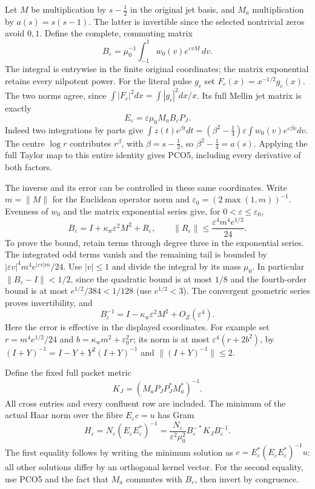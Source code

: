 Let $M$ be multiplication by $s-\frac12$ in the original jet
basis, and $M_a$ multiplication by $a(s)=s(s-1)$. The latter
is invertible since the selected nontrivial zeros avoid $0,1$.
Define the complete, commuting matrix
\[
 B_\varepsilon=\mu_0^{-1}\int_{-1}^1
                 w_0(v)e^{\varepsilon vM}\,dv.
 \tag{PCO4}\label{pco:unit}
\]
The integral is entrywise in the finite original coordinates;
the matrix exponential retains every nilpotent power. For the
literal pulse $g_c$ set $F_c(x)=x^{-1/2}g_c(x)$. The two norms
agree, since $\int|F_c|^2dx=\int|g_c|^2dx/x$. Its full Mellin
jet matrix is exactly
\[
 E_\varepsilon=\varepsilon\mu_0 M_a B_\varepsilon P_J.
 \tag{PCO5}\label{pco:observation}
\]
Indeed two integrations by parts give
$\int z(t)e^{\beta t}dt=(\beta^2-\frac14)
\varepsilon\int w_0(v)e^{\varepsilon\beta v}dv$.
The centre $\log r$ contributes $r^\beta$, with
$\beta=s-\frac12$, so $\beta^2-\frac14=a(s)$.
Applying the full Taylor map to this entire identity gives
PCO5, including every derivative of both factors.

The inverse and its error can be controlled in these same
coordinates. Write $m=\|M\|$ for the Euclidean operator norm
and $\varepsilon_0=(2\max(1,m))^{-1}$. Evenness of $w_0$ and
the matrix exponential series give, for $0<\varepsilon\le
\varepsilon_0$,
\[
 B_\varepsilon=I+\kappa_w\varepsilon^2M^2+R_\varepsilon,
 \qquad
 \|R_\varepsilon\|\le
       \frac{\varepsilon^4m^4e^{1/2}}{24}.
 \tag{PCO6}\label{pco:remainder}
\]
To prove the bound, retain terms through degree three in the
exponential series. The integrated odd terms vanish and the
remaining tail is bounded by
$|\varepsilon v|^4m^4e^{|\varepsilon v|m}/24$.
Use $|v|\le1$ and divide the integral by its mass $\mu_0$.
In particular $\|B_\varepsilon-I\|<1/2$, since the quadratic
bound is at most $1/8$ and the fourth-order bound is at most
$e^{1/2}/384<1/128$ (use $e^{1/2}<3$).
The convergent geometric series proves invertibility, and
\[
 B_\varepsilon^{-1}=I-\kappa_w\varepsilon^2M^2
                              +O_{Z}(\varepsilon^4).
 \tag{PCO7}\label{pco:inverse}
\]
Here the error is effective in the displayed coordinates. For
example set $r=m^4e^{1/2}/24$ and
$b=\kappa_wm^2+\varepsilon_0^2r$; its norm is at most
$\varepsilon^4(r+2b^2)$, by
$(I+Y)^{-1}=I-Y+Y^2(I+Y)^{-1}$ and
$\|(I+Y)^{-1}\|\le2$.

Define the fixed full packet metric
\[
 K_J=(M_aP_JP_J^*M_a^*)^{-1}.
 \tag{PCO8}\label{pco:fixed-metric}
\]
All cross entries and every confluent row are included. The
minimum of the actual Haar norm over the fibre
$E_\varepsilon c=u$ has Gram
\[
 H_\varepsilon
  =N_\varepsilon(E_\varepsilon E_\varepsilon^*)^{-1}
  =\frac{N_\varepsilon}{\varepsilon^2\mu_0^2}
                B_\varepsilon^{-*}K_JB_\varepsilon^{-1}.
 \tag{PCO9}\label{pco:attained}
\]
The first equality follows by writing the minimum solution as
$c=E_\varepsilon^*(E_\varepsilon E_\varepsilon^*)^{-1}u$:
all other solutions differ by an orthogonal kernel vector.
For the second equality, use PCO5 and the fact that $M_a$
commutes with $B_\varepsilon$, then invert by congruence.

